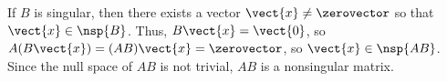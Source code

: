 If $B$ is singular, then there exists a vector $\vect{x}\ne\zerovector$ so that $\vect{x}\in \nsp{B}$.  Thus, $B\vect{x} = \vect{0}$, so $A(B\vect{x}) = (AB)\vect{x} = \zerovector$, so $\vect{x}\in\nsp{AB}$.  Since the null space of $AB$ is not trivial, $AB$ is a nonsingular matrix.
